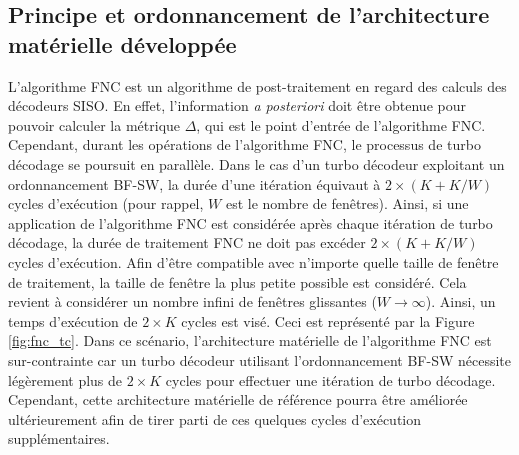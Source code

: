 \subsection{Principe et ordonnancement de l'architecture matérielle développée}
L'algorithme FNC est un algorithme de post-traitement en regard des calculs des décodeurs SISO. En effet, l'information 
\textit{a posteriori} doit être obtenue pour pouvoir calculer la métrique $\Delta$, qui est le point d'entrée de l'algorithme FNC. Cependant, durant les 
opérations de l'algorithme FNC, le processus de turbo décodage se poursuit en parallèle. 
Dans le cas d'un turbo décodeur exploitant un ordonnancement BF-SW, la durée d'une itération équivaut à  $2\times (K+K/W)$ cycles d’exécution
(pour rappel, $W$ est le nombre de fenêtres). 
Ainsi, si une application de l'algorithme FNC est considérée après chaque itération de turbo décodage, la
durée de traitement FNC ne doit pas excéder  $2\times (K+K/W)$ cycles d’exécution.
Afin d'être compatible avec n'importe quelle taille de 
fenêtre de traitement, la taille de fenêtre la plus petite possible est considéré. Cela revient à considérer un nombre 
infini de fenêtres glissantes  ($W\rightarrow \infty$). Ainsi, un temps d'exécution de $2\times K$ cycles est visé.
Ceci est 
représenté par la Figure \ref{fig:fnc_tc}. Dans ce scénario, l'architecture matérielle de l'algorithme FNC est sur-contrainte 
car un turbo décodeur utilisant l'ordonnancement BF-SW nécessite légèrement plus de $2\times K$ cycles pour 
effectuer une itération de turbo décodage. Cependant, cette architecture matérielle de référence pourra 
être améliorée ultérieurement afin de tirer parti de ces quelques cycles d'exécution supplémentaires. 

